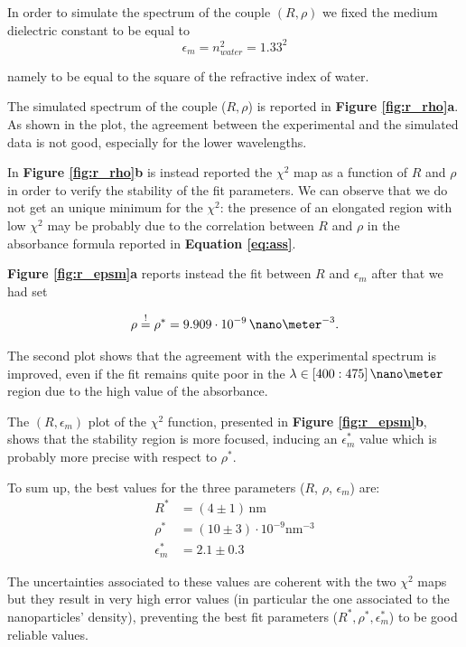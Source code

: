 \documentclass[twocolumn]{article}
\begin{document}
\begin{multicols}{2}
In order to simulate the spectrum of the couple $(R,\rho)$ we fixed the medium dielectric constant to be equal to 
\[\epsilon_m=n_{water}^2=1.33^2\]

\noindent
namely to be equal to the square of the refractive index of water.

The simulated spectrum of the couple ($R,\rho$) is reported in \textbf{Figure \ref{fig:r_rho}a}. As shown in the plot, the agreement between the experimental and the simulated data is not good, especially for the lower wavelengths.

In \textbf{Figure \ref{fig:r_rho}b} is instead reported the $\chi^2$ map as a function of $R$ and $\rho$ in order to verify the stability of the fit parameters. We can observe that we do not get an unique minimum for the $\chi^2$: the presence of an elongated region with low $\chi^2$ may be probably due to the correlation between $R$ and $\rho$ in the absorbance formula reported in \textbf{Equation \ref{eq:ass}}.

\textbf{Figure \ref{fig:r_epsm}a} reports instead the fit between $R$ and $\epsilon_m$ after that we had set 

\[\rho \overset{!}{=} \rho^*=9.909\cdot10^{-9}\,\nano\meter^{-3}.\]

\noindent
The second plot shows that the agreement with the experimental spectrum is improved, even if the fit remains quite poor in the $\lambda \in [400:475]\, \nano\meter$ region due to the high value of the absorbance.

The \( (R,\epsilon_m) \) plot of the $\chi^2$ function, presented in \textbf{Figure \ref{fig:r_epsm}b}, shows that the stability region is more focused, inducing an $\epsilon_m^*$ value which is probably more precise with respect to $\rho^*$.

\noindent
To sum up, the best values for the three parameters ($R$, $\rho$, $\epsilon_m$) are:
\begin{align*}
    R^* &= (4\pm 1)\, \text{nm}\\
    \rho^* &= (10 \pm 3)\cdot 10^{-9} \text{nm}^{-3} \\
    \epsilon_m^* &= 2.1 \pm 0.3
\end{align*}

\noindent
The uncertainties associated to these values are coherent with the two $\chi^2$ maps but they result in very high error values (in particular the one associated to the nanoparticles' density), preventing the best fit parameters ($R^*, \rho^*, \epsilon_m^*$) to be good reliable values. 


\end{multicols}
\end{document}
